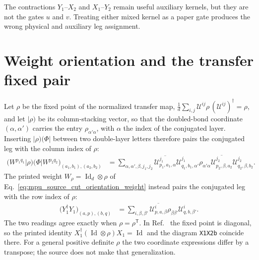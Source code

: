 \documentclass{article}
\begin{document}
The contractions $Y_1$--$X_2$ and $X_1$--$Y_2$ remain useful auxiliary
kernels, but they are not the gates $u$ and $v$. Treating either mixed kernel
as a paper gate produces the wrong physical and auxiliary leg assignment.

\section{Weight orientation and the transfer fixed pair}

Let $\rho$ be the fixed point of the normalized transfer map,
$\frac1d\sum_{i,j}\mathcal U^{ij}\rho\,(\mathcal U^{ij})^\dagger=\rho$, and let
$\lvert\rho)$ be its column-stacking vector, so that the doubled-bond
coordinate $(\alpha,\alpha')$ carries the entry $\rho_{\alpha'\alpha}$, with
$\alpha$ the index of the conjugated layer. Inserting $\lvert\rho)(\Phi\rvert$
between two double-layer letters therefore pairs the conjugated leg with the
column index of $\rho$:
\begin{align}
    \bigl(W^{p_1q_1}\lvert\rho)(\Phi\rvert W^{p_2q_2}\bigr)
    _{(a_1,b_1),(a_2,b_2)}
     & =\sum_{\alpha,\alpha',\beta,j_1,j_2}
    \overline{\mathcal U^{j_1}_{p_1,a_1,\alpha}}
    \mathcal U^{j_1}_{q_1,b_1,\alpha'}\rho_{\alpha'\alpha}
    \overline{\mathcal U^{j_2}_{p_2,\beta,a_2}}
    \mathcal U^{j_2}_{q_2,\beta,b_2}.
    \label{eq:mpu_source_cut_orientation_inserted}
\end{align}
The printed weight $W_\rho=\operatorname{Id}_d\otimes\rho$ of
Eq.~\ref{eq:mpu_source_cut_orientation_weight} instead pairs the conjugated
leg with the row index of $\rho$:
\begin{align}
    \bigl(Y_1^\dagger Y_1\bigr)_{(a,p),(b,q)}
     & =\sum_{i,\beta,\beta'}
    \overline{\mathcal U^{i}_{p,a,\beta}}\rho_{\beta\beta'}
    \mathcal U^{i}_{q,b,\beta'}.
    \label{eq:mpu_source_cut_orientation_weighted_gram}
\end{align}
The two readings agree exactly when $\rho=\rho^{\mathsf T}$. In
Ref.~\cite{Cirac2017MPU} the fixed point is diagonal, so the printed identity
$X_1^\dagger(\operatorname{Id}\otimes\rho)X_1=\operatorname{Id}$ and the
diagram \texttt{X1X2b} coincide there. For a general positive definite $\rho$
the two coordinate expressions differ by a transpose; the source does not make
that generalization.
\end{document}
